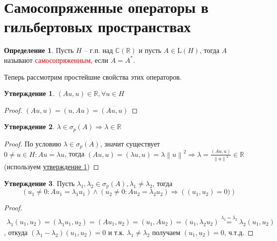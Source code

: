 \documentclass[12pt,a4paper]{article}
\theoremstyle{definition}
\newtheorem{definition}{Определение}[section]
\newtheorem{proposition}{Утверждение}[section]
\newcommand{\Real}{\mathbb{R}}
\newcommand{\Cmplx}{\mathbb{C}}
\newcommand{\norm}[1]{\left\lVert#1\right\rVert}
\newcommand{\linearo}[1]{\textrm{L}(#1)}
\begin{document}
\section{Самосопряженные операторы в гильбертовых пространствах}
\begin{definition}
	Пусть $H$ -- г.п. над $\Cmplx (\Real)$ и пусть $A \in \linearo{H}$, тогда $A$ называют \textcolor{red}{самосопряженным}, если $A = A^*$. 
\end{definition}

Теперь рассмотрим простейшие свойства этих операторов.

\begin{proposition}\label{prop:2}
	$(Au, u) \in \Real, \forall u \in H$
\end{proposition}
\begin{proof}
	$(Au, u) = (u, Au) = \overline{(Au, u)}$
\end{proof}

\begin{proposition}\label{prop:3}
	$\lambda \in \sigma_p (A) \Rightarrow \lambda \in \Real$
\end{proposition}
\begin{proof}
	По условию $\lambda \in \sigma_p (A)$, значит существует \\ $0 \neq u \in H: Au = \lambda u$, тогда $(Au, u) = (\lambda u, u) = \lambda \norm{u}^2 \Rightarrow \lambda = \frac{(Au, u)}{\norm{u}^2} \in \Real$ (используем \hyperref[prop:2]{утверждение 1})
\end{proof}

\begin{proposition}
	Пусть $\lambda_1, \lambda_2 \in \sigma_p (A), \lambda_1 \neq \lambda_2$, тогда
	$$(u_1 \neq 0: Au_1 = \lambda_1 u_1) \wedge (u_2 \neq 0: Au_2 = \lambda_2 u_2) \Rightarrow \left((u_1, u_2) = 0)\right)$$
\end{proposition}
\begin{proof}
	\begin{multline*}
		\lambda_1 (u_1, u_2) = (\lambda_1 u_1, u_2) = (Au_1, u_2) = (u_1, Au_2) = (u_1, \lambda_2 u_2) \overset{\hyperref[prop:3]{\lambda_2 = \overline{\lambda_2}}}{=} \lambda_2 (u_1, u_2)
	\end{multline*}
	, откуда $(\lambda_1 - \lambda_2) (u_1, u_2) = 0$ и т.к. $\lambda_1 \neq \lambda_2$ получаем $(u_1, u_2) = 0$, ч.т.д.
\end{proof}
\end{document}
